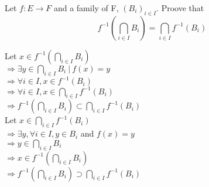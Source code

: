 \documentclass{article}
\begin{document}
\noindent Let $f: E \rightarrow F $ and a family
of F, $(B_i)_{i \in I} $. Proove that\\
\[
f^{-1}(\bigcap_{i \in I}B_i) =
\bigcap_{i \in I}f^{-1}(B_i)
\]

\noindent Let $x \in  f^{-1}(\bigcap_{i \in I}B_i)$\\
$\Rightarrow \exists y \in  \bigcap_{i \in I}B_i \ |
\ f(x) = y$\\
$\Rightarrow \forall i \in I, x \in f^{-1}(B_i)$\\
$\Rightarrow \forall i \in I, x \in 
\bigcap_{i \in I}f^{-1}(B_i)$\\
$\Rightarrow f^{-1}(\bigcap_{i \in I}B_i) \subset 
\bigcap_{i \in I}f^{-1}(B_i)
$\\

\noindent Let $x \in \bigcap_{i \in I}f^{-1}(B_i)$\\
$\Rightarrow \exists y, \forall i \in I, y \in B_i$
and $ f(x) = y$\\
$\Rightarrow y \in \bigcap_{i \in I}B_i$\\
$\Rightarrow x \in f^{-1}(\bigcap_{i \in I}B_i)$\\
$\Rightarrow f^{-1}(\bigcap_{i \in I}B_i) 
\supset \bigcap_{i \in I}f^{-1}(B_i)$
\end{document}
